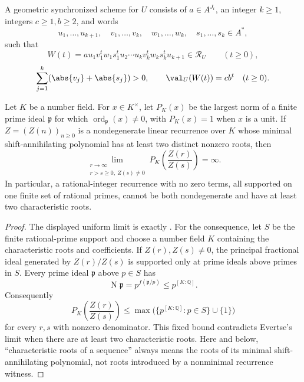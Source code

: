 \begin{definition}
  \label{def:geometric-synchronized-scheme}
  A geometric synchronized scheme for \(U\) consists of
  \(a\in A^{J_{\mathrm r}}\), an integer \(k\ge1\), integers
  \(c\ge1,b\ge2\), and words
  \[
    u_1,\ldots,u_{k+1},\quad
    v_1,\ldots,v_k,\quad w_1,\ldots,w_k,\quad
    s_1,\ldots,s_k\in A^\ast,
  \]
  such that
  \[
    W(t)=a u_1v_1^tw_1s_1^tu_2\cdots
      u_kv_k^tw_ks_k^tu_{k+1}\in\mathcal R_U
      \qquad(t\ge0),
  \]
  \[
    \sum_{j=1}^k(\abs{v_j}+\abs{s_j})>0,
    \qquad \val_U(W(t))=cb^t\quad(t\ge0).
  \]
\end{definition}

\begin{lemma}
  \label{lem:evertse-quotient-support-input}
  Let \(K\) be a number field. For \(x\in K^\times\), let \(P_K(x)\)
  be the largest norm of a finite prime ideal \(\mathfrak p\) for which
  \(\operatorname{ord}_{\mathfrak p}(x)\ne0\), with \(P_K(x)=1\) when
  \(x\) is a unit. If \(Z=(Z(n))_{n\ge0}\) is a nondegenerate linear
  recurrence over \(K\) whose minimal shift-annihilating polynomial has
  at least two distinct nonzero roots, then
  \[
    \lim_{\substack{r\to\infty\\ r>s\ge0,\ Z(s)\ne0}}
      P_K\!\left(\frac{Z(r)}{Z(s)}\right)=\infty.
  \]
  In particular, a rational-integer recurrence with no zero terms, all
  supported on one finite set of rational primes, cannot be both
  nondegenerate and have at least two characteristic roots.
\end{lemma}

\begin{proof}
  The displayed uniform limit is exactly
  \cite[Theorem~3]{Evertse1984}. For the consequence, let \(S\) be the
  finite rational-prime support and choose a number field \(K\) containing
  the characteristic roots and coefficients. If \(Z(r),Z(s)\ne0\), the
  principal fractional ideal generated by \(Z(r)/Z(s)\) is supported
  only at prime ideals above primes in \(S\). Every prime ideal
  \(\mathfrak p\) above \(p\in S\) has
  \[
    \operatorname N\mathfrak p=p^{f(\mathfrak p/p)}
      \le p^{[K:\mathbb Q]}.
  \]
  Consequently
  \[
    P_K\!\left(\frac{Z(r)}{Z(s)}\right)
      \le \max\bigl(\{p^{[K:\mathbb Q]}:p\in S\}\cup\{1\}\bigr)
  \]
  for every \(r,s\) with nonzero denominator. This fixed bound
  contradicts Evertse's limit when there are at least two characteristic
  roots. Here and below, ``characteristic roots of a sequence'' always
  means the roots of its minimal shift-annihilating polynomial, not roots
  introduced by a nonminimal recurrence witness.
\end{proof}

